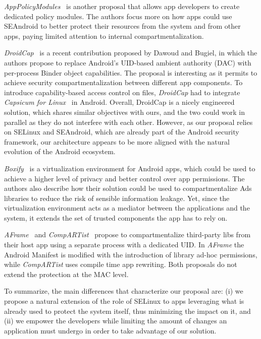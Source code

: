 {\em AppPolicyModules}~\cite{seapp_apm} is another proposal that
allows app developers to create dedicated policy modules. The authors
focus more on how apps could use SEAndroid to better protect their
resources from the system and from other apps, paying limited
attention to internal compartmentalization.

{\em DroidCap}~\cite{seapp_droidcap} is a recent contribution proposed
by Dawoud and Bugiel, in which the authors propose to replace
Android's UID-based ambient authority (DAC) with per-process Binder
object capabilities.  The proposal is interesting as it permits to
achieve security compartmentalization between different app
components. To introduce capability-based access control on files,
{\em DroidCap} had to integrate {\em Capsicum for
  Linux}~\cite{seapp_capsic} in Android. Overall, DroidCap is a nicely
engineered solution, which shares similar objectives with ours, and
the two could work in parallel as they do not interfere with each
other.  However, as our proposal relies on SELinux and SEAndroid,
which are already part of the Android security framework, our
architecture appears to be more aligned with the natural evolution of
the Android ecosystem.

{\em Boxify}~\cite{seapp_boxify} is a virtualization environment for
Android apps, which could be used to achieve a higher level of privacy
and better control over app permissions. The authors also describe how
their solution could be used to compartmentalize Ads libraries to
reduce the risk of sensible information leakage.  Yet, since the
virtualization environment acts as a mediator between the applications
and the system, it extends the set of trusted components the app has
to rely on.

{\em AFrame}~\cite{seapp_aframe} and {\em
  CompARTist}~\cite{seapp_10.1145/3133956.3134064} propose to
compartmentalize third-party libs from their host app using a separate
process with a dedicated UID. In {\em AFrame} the Android Manifest is
modified with the introduction of library ad-hoc permissions, while
{\em CompARTist} uses compile time app rewriting. Both proposals do
not extend the protection at the MAC level.

To summarize, the main differences that characterize our proposal are:
(i) we propose a natural extension of the role of SELinux to apps
leveraging what is already used to protect the system itself, thus
minimizing the impact on it, and (ii) we empower the developers while
limiting the amount of changes an application must undergo in order to
take advantage of our solution.

